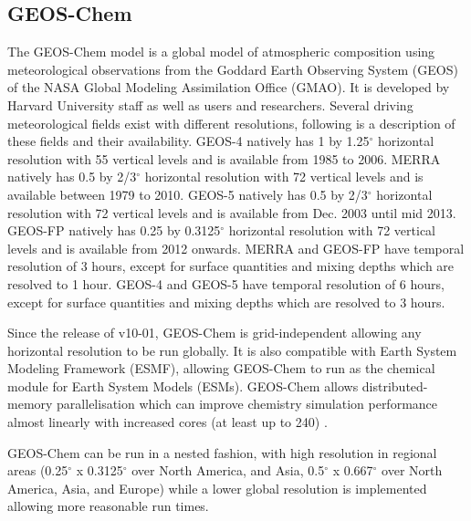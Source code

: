 \subsection{GEOS-Chem}

The GEOS-Chem model is a global model of atmospheric composition using meteorological observations from the Goddard Earth Observing System (GEOS) of the NASA Global Modeling Assimilation Office (GMAO). 
It is developed by Harvard University staff as well as users and researchers. 
Several driving meteorological fields exist with different resolutions, following is a description of these fields and their availability. 
GEOS-4 natively has 1 by 1.25$^\circ$ horizontal resolution with 55 vertical levels and is available from 1985 to 2006. 
MERRA natively has 0.5 by 2/3$^\circ$ horizontal resolution with 72 vertical levels and is available between 1979 to 2010.
GEOS-5 natively has 0.5 by 2/3$^\circ$ horizontal resolution with 72 vertical levels and is available from Dec. 2003 until mid 2013.
GEOS-FP natively has 0.25 by 0.3125$^\circ$ horizontal resolution with 72 vertical levels and is available from 2012 onwards.
MERRA and GEOS-FP have temporal resolution of 3 hours, except for surface quantities and mixing depths which are resolved to 1 hour.
GEOS-4 and GEOS-5 have temporal resolution of 6 hours, except for surface quantities and mixing depths which are resolved to 3 hours.

Since the release of v10-01, GEOS-Chem is grid-independent allowing any horizontal resolution to be run globally. 
It is also compatible with Earth System Modeling Framework (ESMF), allowing GEOS-Chem to run as the chemical module for Earth System Models (ESMs). 
GEOS-Chem allows distributed-memory parallelisation which can improve chemistry simulation performance almost linearly with increased cores (at least up to 240) \cite{Long_2015}.

GEOS-Chem can be run in a nested fashion, with high resolution in regional areas (0.25$^{\circ}$ x 0.3125$^{\circ}$ over North America, and Asia, 0.5$^{\circ}$ x 0.667$^{\circ}$ over North America, Asia, and Europe) while a lower global resolution is implemented allowing more reasonable run times.
  
  
  